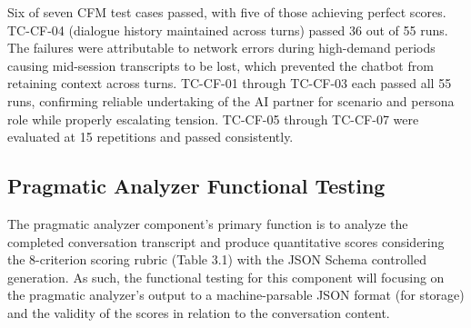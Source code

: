 \noindent Six of seven CFM test cases passed, with five of those achieving perfect scores. TC-CF-04 (dialogue history maintained across turns) passed 36 out of 55 runs. The failures were attributable to network errors during high-demand periods causing mid-session transcripts to be lost, which prevented the chatbot from retaining context across turns. 
TC-CF-01 through TC-CF-03 each passed all 55 runs, confirming reliable undertaking of the AI partner for scenario and persona role while properly escalating tension. TC-CF-05 through TC-CF-07 were evaluated at 15 repetitions and passed consistently.
 
\subsection{Pragmatic Analyzer Functional Testing}
 
  The pragmatic analyzer component's primary function is to analyze the completed conversation transcript and produce quantitative scores considering the 8-criterion scoring rubric (Table 3.1) with the JSON Schema controlled generation. As such, the functional testing for this component will focusing on the pragmatic analyzer's output to a machine-parsable JSON format 
(for storage) and the validity of the scores in relation to the conversation content. 
 
